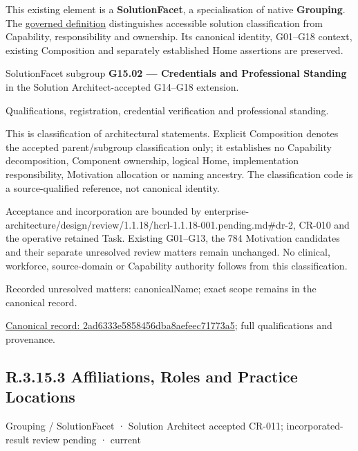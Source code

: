 This existing element is a \textbf{SolutionFacet}, a specialisation of native
\textbf{Grouping}. The \href{\detokenize{../../../../../../../governance/continuum-representation.md#solutionfacet-classification--1119-candidate}}{governed definition}
distinguishes accessible solution classification from Capability, responsibility
and ownership. Its canonical identity, G01–G18 context, existing Composition
and separately established Home assertions are preserved.



SolutionFacet subgroup \textbf{G15.02 — Credentials and Professional Standing} in the Solution Architect-accepted G14–G18 extension.



Qualifications, registration, credential verification and professional standing.



This is classification of architectural statements. Explicit Composition denotes the accepted parent/subgroup classification only; it establishes no Capability decomposition, Component ownership, logical Home, implementation responsibility, Motivation allocation or naming ancestry. The classification code is a source-qualified reference, not canonical identity.



Acceptance and incorporation are bounded by enterprise-architecture/design/review/1.1.18/hcrl-1.1.18-001.pending.md\#dr-2, CR-010 and the operative retained Task. Existing G01–G13, the 784 Motivation candidates and their separate unresolved review matters remain unchanged. No clinical, workforce, source-domain or Capability authority follows from this classification.


{\small Recorded unresolved matters: canonicalName; exact scope remains in the canonical record.}\par
{\footnotesize \href{../../../../../../../continuum/grouping/2ad6333e5858456dba8aefeec71773a5.md}{Canonical record: 2ad6333e5858456dba8aefeec71773a5}; full qualifications and provenance.}\par
\subsection*{R.3.15.3 Affiliations, Roles and Practice Locations}
\label{navigation:R.3.15.3}

\label{element:25a15d4bea2d418d918e3a7e01d9fcbf}
{\small Grouping / SolutionFacet · Solution Architect accepted CR-011; incorporated-result review pending · current}\par

